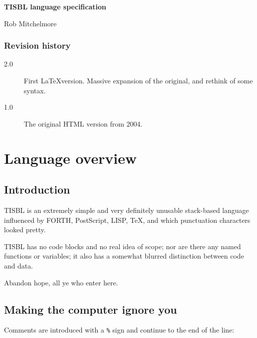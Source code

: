 \documentclass{article}
\begin{document}
{\noindent\bf\LARGE TISBL language specification}

\noindent Rob Mitchelmore

\subsubsection*{Revision history}
\begin{description}
\item[2.0] First \LaTeX version.  Massive expansion of the original, and rethink of some syntax.
\item[1.0] The original HTML version from 2004.
\end{description}

\section{Language overview}

\subsection{Introduction}

TISBL is an extremely simple and very definitely unusable stack-based language influenced by FORTH, PostScript, LISP, \TeX, and which punctuation characters looked pretty.

TISBL has no code blocks and no real idea of scope; nor are there any named functions or variables; it also has a somewhat blurred distinction between code and data.

Abandon hope, all ye who enter here.

\subsection{Making the computer ignore you}

Comments are introduced with a \texttt{\%} sign and continue to the end of the line:
\end{document}
